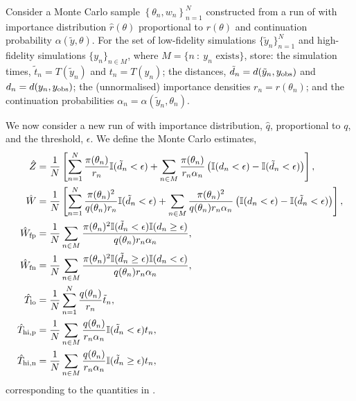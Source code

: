 \documentclass[review,demo]{siamonline190516}
\begin{document}
\begin{definition}
\label{def:MonteCarlo}
Consider a Monte Carlo sample $\left\{ \theta_n, w_n \right\}_{n=1}^{N}$ constructed from a run of  with importance distribution $\hat r(\theta)$ proportional to $r(\theta)$ and continuation probability $\alpha(\tilde y, \theta)$.
For the set of low-fidelity simulations $\{ \tilde y_n \}_{n=1}^{N}$ and high-fidelity simulations $\{ y_n \}_{n \in M}$, where $M = \{ n~:~ y_n \text{ exists} \}$, store: the simulation times, $\tilde t_n = T(\tilde y_n)$ and $t_n = T(y_n)$; the distances, $\tilde d_n = d(\tilde y_n, y_{\mathrm{obs}})$ and $d_n = d(y_n, y_{\mathrm{obs}})$; the (unnormalised) importance densities $r_n = r(\theta_n)$; and the continuation probabilities $\alpha_n = \alpha(\tilde y_n, \theta_n)$.

We now consider a new run of  with importance distribution, $\hat q$, proportional to $q$, and the threshold, $\epsilon$.
We define the Monte Carlo estimates,
\begin{subequations}
\label{eq:MonteCarlo}
\begin{align}
 \hat Z &= \frac{1}{N} \left[ \sum_{n=1}^N \frac{\pi(\theta_n)}{r_n} \mathbb I(\tilde d_n < \epsilon) + \sum_{n \in M} \frac{\pi(\theta_n)}{r_n \alpha_n} \left( \mathbb I(d_n < \epsilon) - \mathbb I(\tilde d_n < \epsilon)\right) \right]
 \label{eq:Zhat}
, \\
 \hat{W} &= \frac{1}{N} \left[ \sum_{n=1}^N \frac{\pi(\theta_n)^2}{q(\theta_n) r_n} \mathbb I(\tilde d_n < \epsilon) + \sum_{n \in M} \frac{\pi(\theta_n)^2}{q(\theta_n) r_n \alpha_n} \left( \mathbb I(d_n < \epsilon) - \mathbb I(\tilde d_n < \epsilon)\right) \right]
 \label{eq:MC_tpfn}
, \\ \fp{\hat{W}} &= \frac{1}{N} \sum_{n \in M} \frac{ \pi(\theta_n)^2  \mathbb I (\tilde d_n < \epsilon) \mathbb I (d_n \geq \epsilon)}{q(\theta_n) r_n \alpha_n}
 \label{eq:MC_fp}
, \\ \fn{\hat{W}} &= \frac{1}{N} \sum_{n \in M} \frac{ \pi(\theta_n)^2 \mathbb I (\tilde d_n \geq \epsilon) \mathbb I (d_n < \epsilon)}{q(\theta_n) r_n \alpha _n} 
 \label{eq:MC_fn}
, \\ \hat T_{\mathrm{lo}} &= \frac{1}{N} \sum_{n=1}^{N} \frac{q(\theta_n)}{r_n} \tilde t_n
 \label{eq:T_lo}
, \\ \hat T_{\mathrm{hi}, \mathrm p} &= \frac{1}{N} \sum_{n \in M} \frac{q(\theta_n)}{r_n \alpha_n} \mathbb I(\tilde d_n < \epsilon) t_n
 \label{eq:T_hi_p}
, \\ \hat T_{\mathrm{hi}, \mathrm n} &= \frac{1}{N} \sum_{n \in M} \frac{q(\theta_n)}{r_n \alpha_n} \mathbb I(\tilde d_n \geq \epsilon) t_n
 \label{eq:T_hi_n}
,
\end{align}
\end{subequations}
corresponding to the quantities in .
\end{definition}
\end{document}
